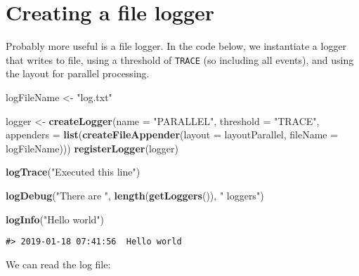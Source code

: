 \documentclass[]{article}
\newenvironment{Shaded}{\begin{snugshade}}{\end{snugshade}}
\newcommand{\DataTypeTok}[1]{\textcolor[rgb]{0.13,0.29,0.53}{#1}}
\newcommand{\KeywordTok}[1]{\textcolor[rgb]{0.13,0.29,0.53}{\textbf{#1}}}
\newcommand{\NormalTok}[1]{#1}
\newcommand{\OperatorTok}[1]{\textcolor[rgb]{0.81,0.36,0.00}{\textbf{#1}}}
\newcommand{\StringTok}[1]{\textcolor[rgb]{0.31,0.60,0.02}{#1}}
\begin{document}
\hypertarget{creating-a-file-logger}{%
\section{Creating a file logger}\label{creating-a-file-logger}}

Probably more useful is a file logger. In the code below, we instantiate
a logger that writes to file, using a threshold of \texttt{TRACE} (so
including all events), and using the layout for parallel processing.

\begin{Shaded}
\begin{Highlighting}[]
\NormalTok{logFileName <-}\StringTok{ "log.txt"}
\end{Highlighting}
\end{Shaded}

\begin{Shaded}
\begin{Highlighting}[]
\NormalTok{logger <-}\StringTok{ }\KeywordTok{createLogger}\NormalTok{(}\DataTypeTok{name =} \StringTok{"PARALLEL"}\NormalTok{,}
                       \DataTypeTok{threshold =} \StringTok{"TRACE"}\NormalTok{,}
                       \DataTypeTok{appenders =} \KeywordTok{list}\NormalTok{(}\KeywordTok{createFileAppender}\NormalTok{(}\DataTypeTok{layout =}\NormalTok{ layoutParallel,}
                                                           \DataTypeTok{fileName =}\NormalTok{ logFileName)))}
\KeywordTok{registerLogger}\NormalTok{(logger)}

\KeywordTok{logTrace}\NormalTok{(}\StringTok{"Executed this line"}\NormalTok{)}

\KeywordTok{logDebug}\NormalTok{(}\StringTok{"There are "}\NormalTok{,  }\KeywordTok{length}\NormalTok{(}\KeywordTok{getLoggers}\NormalTok{()), }\StringTok{" loggers"}\NormalTok{)}

\KeywordTok{logInfo}\NormalTok{(}\StringTok{"Hello world"}\NormalTok{)}
\end{Highlighting}
\end{Shaded}

\begin{verbatim}
#> 2019-01-18 07:41:56  Hello world
\end{verbatim}

We can read the log file:

\begin{Shaded}
\end{Shaded}
\end{document}
